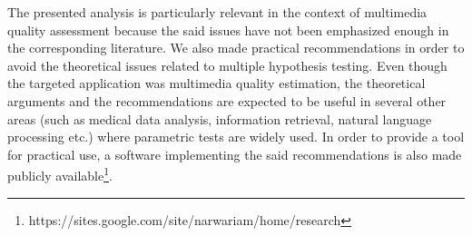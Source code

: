 \documentclass[10pt,final,Twcolumn]{IEEEtran}
\begin{document}
The presented analysis is particularly relevant in the context of multimedia quality assessment because the said issues have not been emphasized enough in the corresponding literature. We also made practical recommendations in order to avoid the theoretical issues related to multiple hypothesis testing. Even though the targeted application was multimedia quality estimation, the theoretical arguments and the recommendations are expected to be useful in several other areas (such as medical data analysis, information retrieval, natural language processing etc.) where parametric tests are widely used. In order to provide a tool for practical use, a software implementing the said recommendations is also made publicly available\footnote{https://sites.google.com/site/narwariam/home/research}.   





 


















%
%
%




\end{document}
